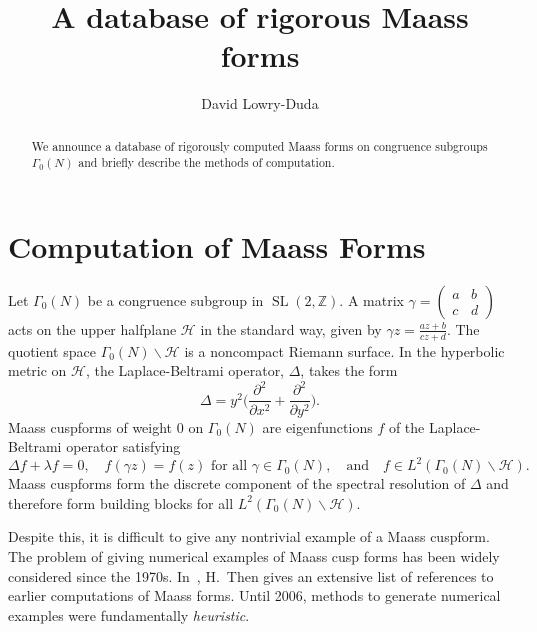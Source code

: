 \documentclass[11pt,reqno,oneside]{amsart}
\title{A database of rigorous Maass forms}
\author{David Lowry-Duda}
\date{}
\theoremstyle{plain}
\theoremstyle{definition}
\DeclareMathOperator{\SL}{SL}
\begin{document}
\begin{abstract}
  We announce a database of rigorously computed Maass forms on congruence
  subgroups $\Gamma_0(N)$ and briefly describe the methods of computation.
\end{abstract}


\maketitle


\section{Computation of Maass Forms}

Let $\Gamma_0(N)$ be a congruence subgroup in $\SL(2, \mathbb{Z})$.
A matrix $\gamma = \left( \begin{smallmatrix} a & b \\ c & d \end{smallmatrix}
\right)$ acts on the upper halfplane $\mathcal{H}$ in the standard way, given
by $\gamma z = \frac{az + b}{cz + d}$.
The quotient space $\Gamma_0(N) \backslash \mathcal{H}$ is a noncompact Riemann
surface.
In the hyperbolic metric on $\mathcal{H}$, the Laplace-Beltrami operator,
$\Delta$, takes the form
\begin{equation}
  \Delta
  =
  y^2 \Big(
    \frac{\partial^2}{\partial x^2} + \frac{\partial^2}{\partial y^2}
  \Big).
\end{equation}
Maass cuspforms of weight $0$ on $\Gamma_0(N)$ are eigenfunctions $f$ of the
Laplace-Beltrami operator satisfying
\begin{equation}
  \Delta f + \lambda f = 0, \quad
  f(\gamma z) = f(z) \text{ for all } \gamma \in \Gamma_0(N),
  \quad \text{and} \quad
  f \in L^2(\Gamma_0(N) \backslash \mathcal{H}).
\end{equation}
Maass cuspforms form the discrete component of the spectral resolution of $\Delta$
and therefore form building blocks for all $L^2(\Gamma_0(N) \backslash
\mathcal{H})$.

Despite this, it is difficult to give any nontrivial example of a Maass
cuspform.
The problem of giving numerical examples of Maass cusp forms has been widely
considered since the 1970s.
In~\cite{then2005maass}, H.\ Then gives an extensive list of references to
earlier computations of Maass forms.
Until 2006, methods to generate numerical examples were
fundamentally \emph{heuristic}.
\end{document}
